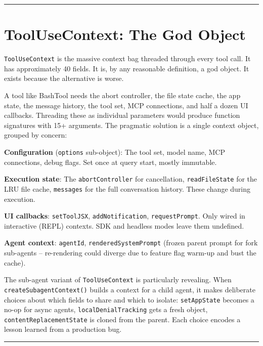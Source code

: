 \documentclass[
  english,
  11pt,
  letterpaper,
]{book}
\begin{document}
\begin{center}\rule{0.5\linewidth}{0.5pt}\end{center}

\section{ToolUseContext: The God
Object}\label{toolusecontext-the-god-object}

\texttt{ToolUseContext} is the massive context bag threaded through
every tool call. It has approximately 40 fields. It is, by any
reasonable definition, a god object. It exists because the alternative
is worse.

A tool like BashTool needs the abort controller, the file state cache,
the app state, the message history, the tool set, MCP connections, and
half a dozen UI callbacks. Threading these as individual parameters
would produce function signatures with 15+ arguments. The pragmatic
solution is a single context object, grouped by concern:

\textbf{Configuration} (\texttt{options} sub-object): The tool set,
model name, MCP connections, debug flags. Set once at query start,
mostly immutable.

\textbf{Execution state}: The \texttt{abortController} for cancellation,
\texttt{readFileState} for the LRU file cache, \texttt{messages} for the
full conversation history. These change during execution.

\textbf{UI callbacks}: \texttt{setToolJSX}, \texttt{addNotification},
\texttt{requestPrompt}. Only wired in interactive (REPL) contexts. SDK
and headless modes leave them undefined.

\textbf{Agent context}: \texttt{agentId}, \texttt{renderedSystemPrompt}
(frozen parent prompt for fork sub-agents -- re-rendering could diverge
due to feature flag warm-up and bust the cache).

The sub-agent variant of \texttt{ToolUseContext} is particularly
revealing. When \texttt{createSubagentContext()} builds a context for a
child agent, it makes deliberate choices about which fields to share and
which to isolate: \texttt{setAppState} becomes a no-op for async agents,
\texttt{localDenialTracking} gets a fresh object,
\texttt{contentReplacementState} is cloned from the parent. Each choice
encodes a lesson learned from a production bug.

\begin{center}\rule{0.5\linewidth}{0.5pt}\end{center}
\end{document}
